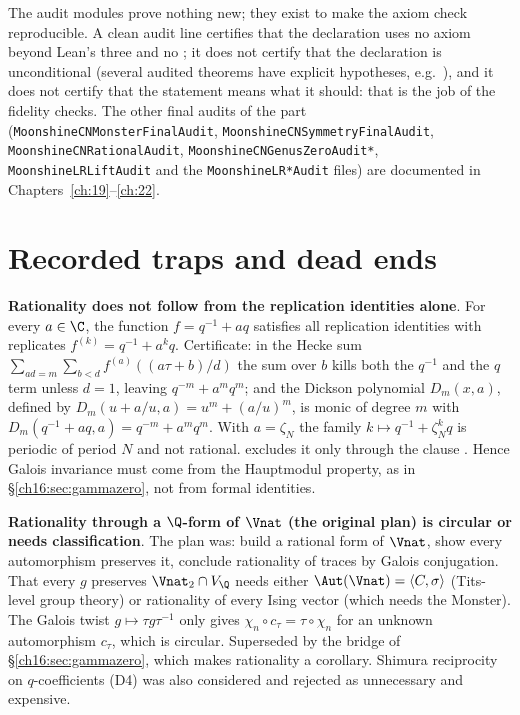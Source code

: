 The audit modules prove nothing new; they exist to make the axiom check reproducible.  A clean audit line certifies
that the declaration uses no axiom beyond Lean's three and no ; it does not certify that the declaration is
unconditional (several audited theorems have explicit hypotheses, e.g.\ ), and it does
not certify that the statement means what it should: that is the job of the fidelity checks.  The other final audits of
the part (\texttt{MoonshineCNMonsterFinalAudit}, \texttt{MoonshineCNSymmetryFinalAudit},
\texttt{MoonshineCNRationalAudit}, \texttt{MoonshineCNGenusZeroAudit*}, \texttt{MoonshineLRLiftAudit} and the
\texttt{MoonshineLR*Audit} files) are documented in Chapters~\ref{ch:19}--\ref{ch:22}.

\section{Recorded traps and dead ends}\label{ch16:sec:traps}

\begin{warning}
\textbf{Rationality does not follow from the replication identities alone}.  For
every $a\in\C$, the function $f=q^{-1}+aq$ satisfies all replication identities with replicates $f^{(k)}=q^{-1}+a^kq$.
Certificate: in the Hecke sum $\sum_{ad=m}\sum_{b<d}f^{(a)}((a\tau+b)/d)$ the sum over $b$ kills both the $q^{-1}$ and
the $q$ term unless $d=1$, leaving $q^{-m}+a^mq^m$; and the Dickson polynomial $D_m(x,a)$, defined by
$D_m(u+a/u,a)=u^m+(a/u)^m$, is monic of degree $m$ with $D_m(q^{-1}+aq,a)=q^{-m}+a^mq^m$.  With $a=\zeta_N$ the family
$k\mapsto q^{-1}+\zeta_N^kq$ is periodic of period $N$ and not rational.   excludes it only
through the clause .  Hence Galois invariance must come from the Hauptmodul property, as in
\S\ref{ch16:sec:gammazero}, not from formal identities.
\end{warning}

\begin{warning}
\textbf{Rationality through a $\Q$-form of $\Vnat$ (the original plan) is circular or needs classification}.
The plan was: build a rational form of
$\Vnat$, show every automorphism preserves it, conclude rationality of traces by Galois conjugation.  That every $g$
preserves $\Vnat_2\cap V_\Q$ needs either $\Aut(\Vnat)=\langle C,\sigma\rangle$ (Tits-level group theory) or
rationality of every Ising vector (which needs the Monster).  The Galois twist $g\mapsto\tau g\tau^{-1}$ only gives
$\chi_n\circ c_\tau=\tau\circ\chi_n$ for an unknown automorphism $c_\tau$, which is circular.  Superseded by the bridge
of \S\ref{ch16:sec:gammazero}, which makes rationality a corollary.  Shimura reciprocity on $q$-coefficients (D4) was
also considered and rejected as unnecessary and expensive.
\end{warning}

